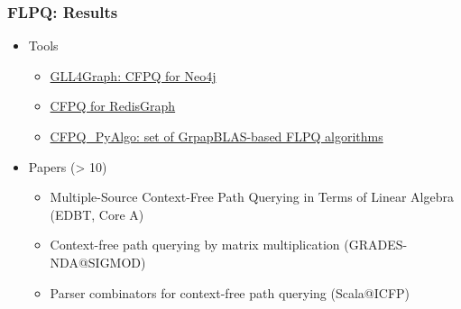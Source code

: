 \documentclass[xcolor=table,aspectratio=169]{beamer}
\begin{document}
\begin{frame}[fragile]
  \frametitle{FLPQ: Results}
    \begin{itemize}
      \item Tools
      \begin{itemize}
        \item \href{https://github.com/JetBrains-Research/GLL4Graph}{GLL4Graph: CFPQ for Neo4j}
        \item \href{https://github.com/YaccConstructor/RedisGraph}{CFPQ for RedisGraph}
        \item \href{https://github.com/JetBrains-Research/CFPQ_PyAlgo}{CFPQ\_PyAlgo: set of GrpapBLAS-based FLPQ algorithms}
      \end{itemize}
      \item Papers (> 10)
      \begin{itemize}
        \item Multiple-Source Context-Free Path Querying in Terms of Linear Algebra (EDBT, Core A)
        \item Context-free path querying by matrix multiplication (GRADES-NDA@SIGMOD)
        \item Parser combinators for context-free path querying (Scala@ICFP)
      \end{itemize} 
    \end{itemize}
\end{frame}
\end{document}
